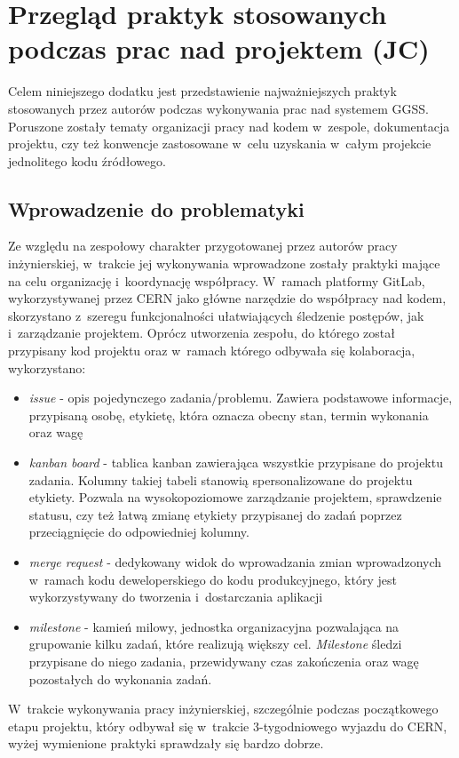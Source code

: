 \appendix
\chapter{Przegląd praktyk stosowanych podczas prac nad projektem (JC)}
\label{cha:practices}

Celem niniejszego dodatku jest przedstawienie najważniejszych praktyk stosowanych przez autorów podczas wykonywania prac nad systemem GGSS. Poruszone zostały tematy organizacji pracy nad kodem w~zespole, dokumentacja projektu, czy też konwencje zastosowane w~celu uzyskania w~całym projekcie jednolitego kodu źródłowego.

\section{Wprowadzenie do problematyki}
Ze względu na zespołowy charakter przygotowanej przez autorów pracy inżynierskiej, w~trakcie jej wykonywania wprowadzone zostały praktyki mające na celu organizację i~koordynację współpracy. W~ramach platformy GitLab, wykorzystywanej przez CERN jako główne narzędzie do współpracy nad kodem, skorzystano z~szeregu funkcjonalności ułatwiających śledzenie postępów, jak i~zarządzanie projektem. Oprócz utworzenia zespołu, do którego został przypisany kod projektu oraz w~ramach którego odbywała się kolaboracja, wykorzystano:
\begin{itemize}
\item \emph{issue} - opis pojedynczego zadania/problemu. Zawiera podstawowe informacje, przypisaną osobę, etykietę, która oznacza obecny stan, termin wykonania oraz wagę
\item \emph{kanban board} - tablica kanban zawierająca wszystkie przypisane do projektu zadania. Kolumny takiej tabeli stanowią spersonalizowane do projektu etykiety. Pozwala na wysokopoziomowe zarządzanie projektem, sprawdzenie statusu, czy też łatwą zmianę etykiety przypisanej do zadań poprzez przeciągnięcie do odpowiedniej kolumny. %
\item \emph{merge request} - dedykowany widok do wprowadzania zmian wprowadzonych w~ramach kodu deweloperskiego do kodu produkcyjnego, który jest wykorzystywany do tworzenia i~dostarczania aplikacji
\item \emph{milestone} - kamień milowy, jednostka organizacyjna pozwalająca na grupowanie kilku zadań, które realizują większy cel. \emph{Milestone} śledzi przypisane do niego zadania, przewidywany czas zakończenia oraz wagę pozostałych do wykonania zadań.
\end{itemize}
W~trakcie wykonywania pracy inżynierskiej, szczególnie podczas początkowego etapu projektu, który odbywał się w~trakcie 3-tygodniowego wyjazdu do CERN, wyżej wymienione praktyki sprawdzały się bardzo dobrze.

